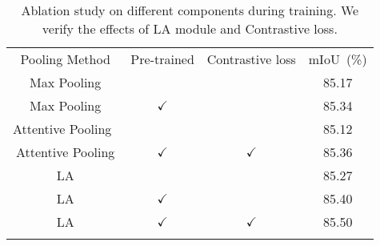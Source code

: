 \documentclass[journal]{IEEEtran}
\begin{document}
\begin{table}[tbp]
\footnotesize
\caption{Ablation study on different components during training. We verify the effects of LA module and Contrastive loss. 
}   
\label{table:Contrastive loss}
\begin{center}
\resizebox{\linewidth}{!}
{
\setlength{\tabcolsep}{3pt}
\begin{tabular}{c|c|c|c}
\shline
Pooling Method & Pre-trained & Contrastive loss & mIoU~(\%) \\
\shline
Max Pooling & & & 85.17 \\
Max Pooling & $\checkmark$ & & 85.34 \\
Attentive Pooling~\cite{hu2020randla} & & & 85.12 \\ 
{\color{black}Attentive Pooling} & {\color{black}$\checkmark$} & {\color{black}$\checkmark$} & {\color{black}85.36} \\ 
\hline
LA & & & 85.27 \\
LA & $\checkmark$ & & 85.40 \\
LA & $\checkmark$ & $\checkmark$ & 85.50 \\ 

\shline
\end{tabular}}
\end{center}
\end{table}
\end{document}
